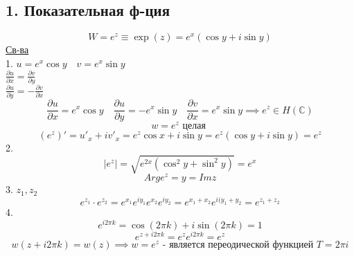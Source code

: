 \documentclass[a4paper]{article}
\begin{document}
    \subsection*{1. Показательная ф-ция}
    \[
        W = e^{z} \equiv \exp(z) = e^{x}(\cos y + i \sin y)
    \]
    \underline{Св-ва} \\ 
    1. $ u = e^{x} \cos y \quad v = e^{x} \sin y $ \\
    $ \frac{\partial u}{\partial x} = \frac{\partial v}{\partial y} $ \\
    $ \frac{\partial u}{\partial y} = -\frac{\partial v}{\partial x} $ \\
    \[
        \frac{\partial u}{\partial x} = e^{x}\cos y \quad
        \frac{\partial u}{\partial y} = -e^{x} \sin y \quad \frac{\partial v}{\partial x} 
        = e^{x}\sin y \implies e^{z} \in H(\mathbb{C})
    \]
    \[
        w = e^{z} \text{ целая }
    \]
    \[
        (e^{z})' = u'_x + i v'_x = e^{z} \cos x + i \sin y = e^{z} (\cos y + i \sin y) =
        e^{z}
    \]
    2.
    \[
        |e^{z}| = \sqrt{e^{2x}(\cos^2y + \sin^2 y)} = e^{x}
    \]
    \[
        Arg e^{z} = y = Im z
    \]
    3. $ z_1, z_2 $ 
    \[
        e^{z_1} \cdot e^{z_2}= e^{x_1} e^{iy_1} e^{x_2} e^{iy_2} = 
        e^{x_1 + x_2} e^{i (y_1+ y_2}= e^{z_1 + z_2}
    \]
    4.\[
        e^{i 2\pi k} = \cos(2\pi k) + i\sin(2\pi k) = 1
    \]
    \[
        e^{z + i 2\pi k} = e^{z} e ^{i 2 \pi k}= e^{z}
    \]
    \[
        w(z+ i 2 \pi k) = w(z) \implies w = e^{z} \text{ - является переодической
        функцией } T = 2\pi i
    \]
\end{document}
